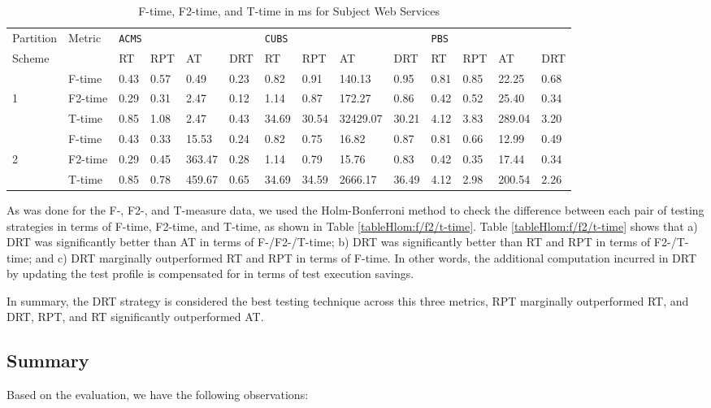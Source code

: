 \documentclass[10pt,journal,compsoc]{IEEEtran}
\begin{document}
\begin{table}
	\caption{F-time, F2-time, and T-time in ms for Subject Web Services}
	\centering
	\label{tab:time}
	\begin{tabular}{llllllllllllll}
	\toprule
	Partition&\multirow{2}{*}{Metric}&\multicolumn{4}{l}{\texttt{ACMS}}&\multicolumn{4}{l}{\texttt{CUBS}}&\multicolumn{4}{l}{\texttt{PBS}} \\ \cmidrule(lr){3-6} \cmidrule(lr){7-10} \cmidrule(lr){11-14}
	Scheme   &        &RT  &RPT   &AT     &DRT    &RT   &RPT   &AT      &DRT   &RT  &RPT   &AT    &DRT  \\ \midrule
	         &F-time  &0.43&0.57  &0.49   &0.23   &0.82 &0.91  &140.13  &0.95  &0.81&0.85  &22.25 &0.68 \\
	1        &F2-time &0.29&0.31  &2.47   &0.12   &1.14 &0.87  &172.27  &0.86  &0.42&0.52  &25.40 &0.34 \\
	         &T-time  &0.85&1.08  &2.47   &0.43   &34.69&30.54 &32429.07&30.21 &4.12&3.83  &289.04&3.20 \\ \midrule
	         &F-time  &0.43&0.33  &15.53  &0.24   &0.82 &0.75  &16.82   &0.87  &0.81&0.66  &12.99 &0.49 \\
	2        &F2-time &0.29&0.45  &363.47 &0.28   &1.14 &0.79  &15.76   &0.83  &0.42&0.35  &17.44 &0.34 \\
	         &T-time  &0.85&0.78  &459.67 &0.65   &34.69&34.59 &2666.17 &36.49 &4.12&2.98  &200.54&2.26 \\
	\bottomrule
	\end{tabular}
\end{table}


As was done for the F-, F2-, and T-measure data, we used the Holm-Bonferroni method to check the difference between each pair of testing strategies in terms of F-time, F2-time, and T-time, as shown in Table \ref{tableHlom:f/f2/t-time}.
Table \ref{tableHlom:f/f2/t-time} shows that a) DRT was significantly better than AT in terms of F-/F2-/T-time; b) DRT was significantly better than RT and RPT in terms of F2-/T-time; and c) DRT marginally outperformed RT and RPT in terms of F-time.
In other words, the additional computation incurred in DRT by updating the test profile is compensated for in terms of test execution savings.

In summary, the DRT strategy is considered the best testing technique across this three metrics, RPT marginally outperformed RT, and DRT, RPT, and RT significantly outperformed AT.

\subsection{Summary}
\label{sec:summary}
Based on the evaluation, we have the following observations:
\end{document}
